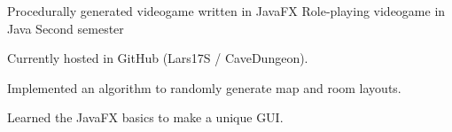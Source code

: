 

\begin{cventries}

\cventry
    {Procedurally generated videogame written in JavaFX} %
    {Role-playing videogame in Java} %
    {Second semester} %
    {}
    {
      \begin{cvitems} %
        \item {Currently hosted in GitHub (Lars17S / CaveDungeon).}
        \item {Implemented an algorithm to randomly generate map and room layouts.}
        \item {Learned the JavaFX basics to make a unique GUI.}
      \end{cvitems}
    }

\end{cventries}
